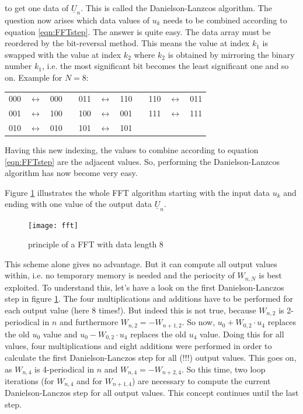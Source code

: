 to get one data of $\underline{U}_n$. This is called the
Danielson-Lanzcos algorithm.
The question now arises which data values of $u_k$
needs to be combined according to equation \eqref{eqn:FFTstep}.
The answer is quite easy. The data array must be reordered by the
bit-reversal method. This means the value at index $k_1$ is swapped
with the value at index $k_2$ where $k_2$ is obtained by mirroring
the binary number $k_1$, i.e. the most significant bit becomes the
least significant one and so on. Example for $N=8$:

\addvspace{12pt}

\begin{tabular}{ccccccccccc}
000 & $\leftrightarrow$ & 000  & \qquad\qquad &  011 & $\leftrightarrow$ & 110  & \qquad\qquad &  110 & $\leftrightarrow$ & 011 \\
001 & $\leftrightarrow$ & 100  & \qquad\qquad &  100 & $\leftrightarrow$ & 001  & \qquad\qquad &  111 & $\leftrightarrow$ & 111 \\
010 & $\leftrightarrow$ & 010  & \qquad\qquad &  101 & $\leftrightarrow$ & 101 \\
\end{tabular}

\addvspace{12pt}

Having this new indexing, the values to combine according to
equation \ref{eqn:FFTstep} are the adjacent values. So, performing
the Danielson-Lanzcos algorithm has now become very easy.

\addvspace{12pt}

Figure \ref{fig:fft} illustrates the whole FFT algorithm starting with the
input data $u_k$ and ending with one value of the output data
$\underline{U}_n$.

\begin{figure}[htb]
\begin{center}
\texttt{[image: fft]}
\end{center}
\caption{principle of a FFT with data length 8}
\label{fig:fft}
\end{figure}
\FloatBarrier

This scheme alone gives no advantage. But it can compute all output
values within, i.e. no temporary memory is needed and the periocity
of $W_{n,N}$ is best exploited. To understand this, let's have a look
on the first Danielson-Lanczos step in figure \ref{fig:fft}. The four
multiplications and additions have to be performed for each output
value (here 8 times!). But indeed this is not true, because $W_{n,2}$
is 2-periodical in $n$ and furthermore $W_{n,2} = -W_{n+1,2}$. So now,
$u_0 + W_{0,2}\cdot u_4$ replaces the old $u_0$ value and
$u_0 - W_{0,2}\cdot u_4$ replaces the old $u_4$ value. Doing this for
all values, four multiplications and eight additions were performed
in order to calculate the first Danielson-Lanczos step for all (!!!)
output values. This goes on, as $W_{n,4}$ is 4-periodical in $n$ and
$W_{n,4} = -W_{n+2,4}$. So this time, two loop iterations (for $W_{n,4}$
and for $W_{n+1,4}$) are necessary to compute the current
Danielson-Lanczos step for all output values. This concept continues
until the last step.

